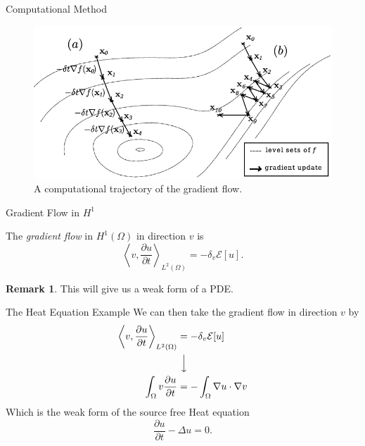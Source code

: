 \documentclass[usenames,dvipsnames]{beamer}
\theoremstyle{definition}
\newtheorem*{remark}{Remark}
\theoremstyle{theorem}
\begin{document}
        \begin{frame}{Computational Method}
            \begin{figure}[H]
                \centering
                \includegraphics[width=.7\textwidth]{images/gradient-trajectory.png}
                \caption{A computational trajectory of the gradient flow.}
                \label{fig:gradient_trajectory}
            \end{figure}
        \end{frame}
        
        \begin{frame}{Gradient Flow in $H^1$}
        \begin{definition}
            The \emph{gradient flow} in $H^1(\Omega)$ in direction $v$ is
            \[
            \left\langle v,\frac{\partial u}{\partial t}\right\rangle_{L^2(\Omega)}=-\delta_v \mathcal{E}[u].
            \]
        \end{definition}
        \pause
        \begin{remark}
            This will give us a weak form of a PDE.
        \end{remark}
        \end{frame}
        
        \begin{frame}{The Heat Equation Example}
            We can then take the gradient flow in direction $v$ by
            \begin{align*}
            \left\langle v,\frac{\partial u}{\partial t}\right\rangle_{L^2(\Omega)}&=-\delta_v \mathcal{E}[u]\\ 
            &~\Big\downarrow\\
            \int_\Omega v\frac{\partial u}{\partial t} &= -\int_\Omega \nabla u \cdot \nabla v 
            \end{align*}
            Which is the weak form of the source free Heat equation
            \[
            \frac{\partial u}{\partial t} - \Delta u = 0.
            \]
        \end{frame}
        
\end{document}
